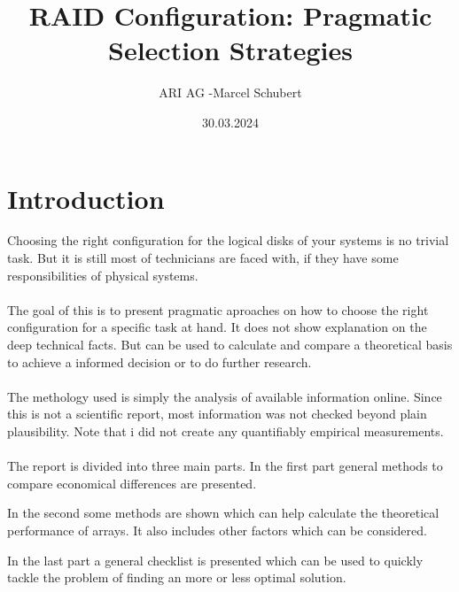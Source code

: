 \documentclass{article}
\title{RAID Configuration: Pragmatic Selection Strategies}
\author{ARI AG -Marcel Schubert}
\date{30.03.2024}
\begin{document}
\maketitle

\section*{Introduction}
Choosing the right configuration for the logical disks
of your systems is no trivial task. But it is still most of technicians are faced with,
if they have some responsibilities of physical systems. 
\\ \\
The goal of this is to present pragmatic aproaches on
how to choose the right configuration for a specific task at hand. 
It does not show explanation on the deep technical facts.
But can be used to calculate and compare a theoretical basis
to achieve a informed decision or to do further research.
\\ \\
The methology used is simply the analysis of available information online.
Since this is not a scientific report, most information was
not checked beyond plain plausibility. Note that i did not 
create any quantifiably empirical measurements.
\\ \\
The report is divided into three main parts.
In the first part general methods to compare
economical differences are presented.

In the second some methods are shown which can help
calculate the theoretical performance of arrays.
It also includes other factors which can be considered.

In the last part a general checklist is presented which
can be used to quickly tackle the problem of finding an
more or less optimal solution.
\end{document}
